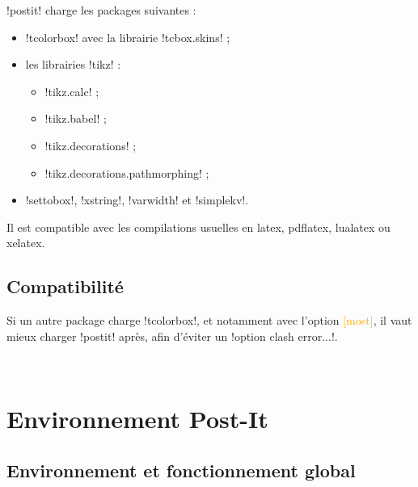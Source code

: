 \documentclass[french,a4paper,11pt]{article}
\newcommand\Cle[1]{{\small\sffamily\textlangle \textcolor{orange}{#1}\textrangle}}
\begin{document}
\begin{noteblock}
\packagetex!postit! charge les packages suivantes :

\begin{itemize}
	\item \packagetex!tcolorbox! avec la librairie \packagetex!tcbox.skins! ;
	\item les librairies \packagetex!tikz! :
	\begin{itemize}
		\item \packagetex!tikz.calc! ;
		\item \packagetex!tikz.babel! ;
		\item \packagetex!tikz.decorations! ;
		\item \packagetex!tikz.decorations.pathmorphing! ;
	\end{itemize}
	\item \packagetex!settobox!, \packagetex!xstring!, \packagetex!varwidth! et \packagetex!simplekv!.
\end{itemize}

Il est compatible avec les compilations usuelles en \textsf{latex}, \textsf{pdflatex}, \textsf{lualatex} ou \textsf{xelatex}.
\end{noteblock}

\subsection{Compatibilité}

\begin{cautionblock}
Si un autre package charge \packagetex!tcolorbox!, et notamment avec l'option \Cle{[most]}, il vaut mieux charger \packagetex!postit! après, afin d'éviter un \motcletex!option clash error...!.
\end{cautionblock}


\vfill~

\pagebreak

\section{Environnement Post-It}

\subsection{Environnement et fonctionnement global}
\end{document}
